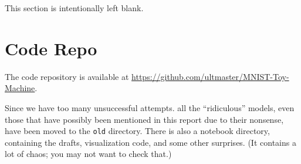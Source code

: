 \documentclass[a4paper,10pt,UTF8]{article}
\numberwithin{equation}{section}
\numberwithin{figure}{section}
\begin{document}
This section is intentionally left blank.

\section{Code Repo}

The code repository is available at \url{https://github.com/ultmaster/MNIST-Toy-Machine}.

Since we have too many unsuccessful attempts. all the ``ridiculous'' models, even those that have possibly been mentioned in this report due to their nonsense, have been moved to the \verb|old| directory. There is also a notebook directory, containing the drafts, visualization code, and some other surprises. (It contains a lot of chaos; you may not want to check that.)
\end{document}
